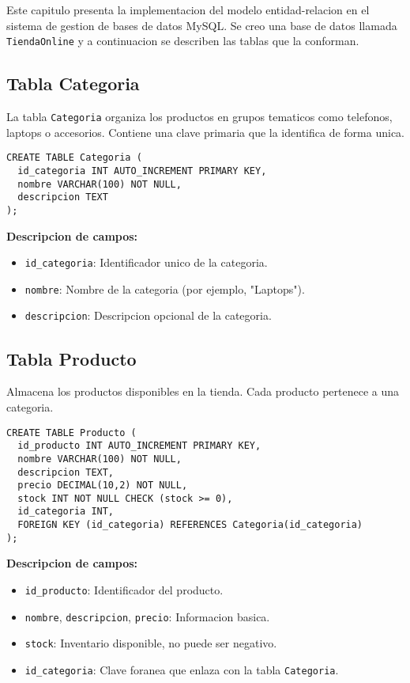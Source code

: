
Este capitulo presenta la implementacion del modelo entidad-relacion en el sistema de gestion de bases de datos MySQL. Se creo una base de datos llamada \texttt{TiendaOnline} y a continuacion se describen las tablas que la conforman.

\subsection{Tabla Categoria}

La tabla \texttt{Categoria} organiza los productos en grupos tematicos como telefonos, laptops o accesorios. Contiene una clave primaria que la identifica de forma unica.

\begin{lstlisting}
CREATE TABLE Categoria (
  id_categoria INT AUTO_INCREMENT PRIMARY KEY,
  nombre VARCHAR(100) NOT NULL,
  descripcion TEXT
);
\end{lstlisting}

\textbf{Descripcion de campos:}

\begin{itemize}
  \item \texttt{id\_categoria}: Identificador unico de la categoria.
  \item \texttt{nombre}: Nombre de la categoria (por ejemplo, "Laptops").
  \item \texttt{descripcion}: Descripcion opcional de la categoria.
\end{itemize}

\subsection{Tabla Producto}

Almacena los productos disponibles en la tienda. Cada producto pertenece a una categoria.

\begin{lstlisting}
CREATE TABLE Producto (
  id_producto INT AUTO_INCREMENT PRIMARY KEY,
  nombre VARCHAR(100) NOT NULL,
  descripcion TEXT,
  precio DECIMAL(10,2) NOT NULL,
  stock INT NOT NULL CHECK (stock >= 0),
  id_categoria INT,
  FOREIGN KEY (id_categoria) REFERENCES Categoria(id_categoria)
);
\end{lstlisting}

\textbf{Descripcion de campos:}

\begin{itemize}
  \item \texttt{id\_producto}: Identificador del producto.
  \item \texttt{nombre}, \texttt{descripcion}, \texttt{precio}: Informacion basica.
  \item \texttt{stock}: Inventario disponible, no puede ser negativo.
  \item \texttt{id\_categoria}: Clave foranea que enlaza con la tabla \texttt{Categoria}.
\end{itemize}

